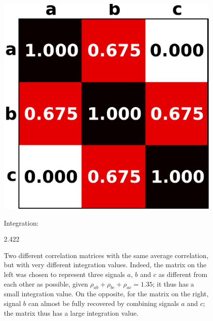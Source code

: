 \documentclass[5p]{elsarticle}
\begin{document}
\begin{figure}
\begin{minipage}{.033\linewidth}
\end{minipage}%
\hfill%
\begin{minipage}{.2\linewidth}
    \hspace*{-.07\linewidth}%
    \includegraphics[width=1.07\linewidth]{correlation_ex2.pdf}
\end{minipage}%
\begin{minipage}{.19\linewidth}
    \center\sffamily
    {\small Integration:}

    2.422
\end{minipage}%
\hspace*{2ex}%

\caption{Two different correlation matrices with the same average
correlation, but with very different integration values. Indeed, the
matrix on the left was chosen to represent three signals $a$, $b$
and $c$ as different from each other as possible, given $\rho_{ab} +
\rho_{bc} + \rho_{ac} = 1.35$; it thus has a small integration value. On
the opposite, for the matrix on the right, signal $b$ can almost be fully
recovered by combining signals $a$ and $c$; the matrix thus has a large
integration value.
\label{fig:integration}}
\end{figure}
\end{document}
